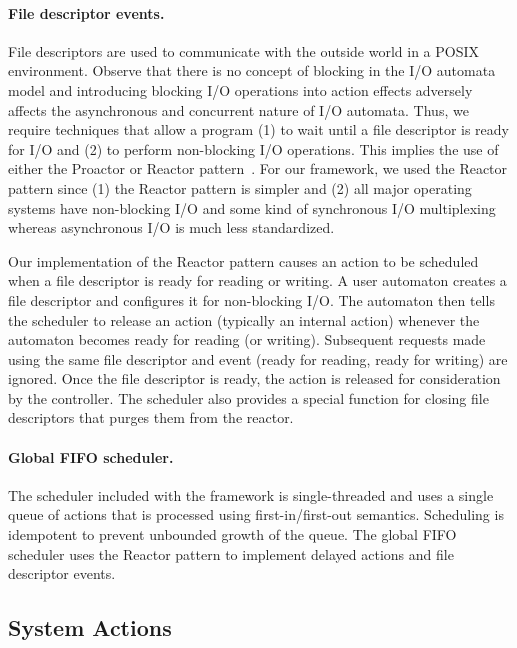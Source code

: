 \paragraph{File descriptor events.}
File descriptors are used to communicate with the outside world in a POSIX environment.
Observe that there is no concept of blocking in the I/O automata model and introducing blocking I/O operations into action effects adversely affects the asynchronous and concurrent nature of I/O automata.
Thus, we require techniques that allow a program (1) to wait until a file descriptor is ready for I/O and (2) to perform non-blocking I/O operations.
This implies the use of either the Proactor or Reactor pattern~\cite{schmidt2000pattern}.
For our framework, we used the Reactor pattern since (1) the Reactor pattern is simpler and (2) all major operating systems have non-blocking I/O and some kind of synchronous I/O multiplexing whereas asynchronous I/O is much less standardized.

Our implementation of the Reactor pattern causes an action to be scheduled when a file descriptor is ready for reading or writing.
A user automaton creates a file descriptor and configures it for non-blocking I/O.
The automaton then tells the scheduler to release an action (typically an internal action) whenever the automaton becomes ready for reading (or writing).
Subsequent requests made using the same file descriptor and event (ready for reading, ready for writing) are ignored.
Once the file descriptor is ready, the action is released for consideration by the controller.
The scheduler also provides a special function for closing file descriptors that purges them from the reactor.

\paragraph{Global FIFO scheduler.}
The scheduler included with the framework is single-threaded and uses a single queue of actions that is processed using first-in/first-out semantics.
Scheduling is idempotent to prevent unbounded growth of the queue.
The global FIFO scheduler uses the Reactor pattern to implement delayed actions and file descriptor events.

\subsection{System Actions\label{system_action_section}}

